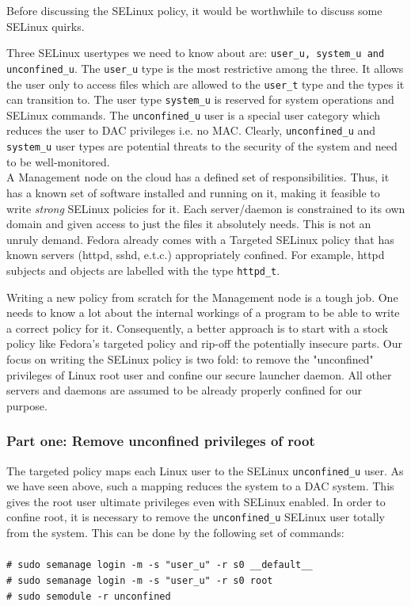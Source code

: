 \documentclass[10pt,twocolumn,pdftex]{article}
\begin{document}
Before discussing the SELinux policy, it would be worthwhile to discuss some SELinux quirks.

Three SELinux usertypes we need to know about are: {\tt user\_u, system\_u and unconfined\_u}. The {\tt user\_u} type is the most restrictive among the three. It allows the user only to access files which are allowed to the {\tt user\_t} type and the types it can transition to. The user type {\tt system\_u} is reserved for system operations and SELinux commands. The {\tt unconfined\_u} user is a special user category which reduces the user to DAC privileges i.e. no MAC. Clearly, {\tt unconfined\_u} and {\tt system\_u} user types are potential threats to the security of the system and need to be well-monitored.\\

A Management node on the cloud has a defined set of responsibilities. Thus, it has a known set of software installed and running on it, making it feasible to write \emph{strong} SELinux policies for it. Each server/daemon is constrained to its own domain and given access to just the files it absolutely needs. This is not an unruly demand. Fedora already comes with a Targeted SELinux policy that has known servers (httpd, sshd, e.t.c.) appropriately confined. For example, httpd subjects and objects are labelled with the type {\tt httpd\_t}. 

Writing a new policy from scratch for the Management node is a tough job. One needs to know a lot about the internal workings of a program to be able to write a correct policy for it. Consequently, a better approach is to start with a stock policy like Fedora's targeted policy and rip-off the potentially insecure parts. Our focus on writing the SELinux policy is two fold: to remove the "unconfined" privileges of Linux root user and confine our secure launcher daemon. All other servers and daemons are assumed to be already properly confined for our purpose.

\subsubsection{Part one: Remove unconfined privileges of root}
The targeted policy maps each Linux user to the SELinux {\tt unconfined\_u} user. As we have seen above, such a mapping reduces the system to a DAC system. This gives the root user ultimate privileges even with SELinux enabled. In order to confine root, it is necessary to remove the {\tt unconfined\_u} SELinux user totally from the system. This can be done by the following set of commands:\\ \\
{\tt \# sudo semanage login -m -s "user\_u" -r s0 \_\_default\_\_}\\
{\tt \# sudo semanage login -m -s "user\_u" -r s0 root} \\
{\tt \# sudo semodule -r unconfined}\\
\end{document}

